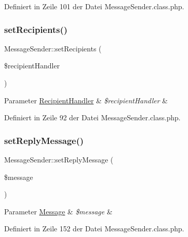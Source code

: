 Definiert in Zeile 101 der Datei Message\+Sender.\+class.\+php.

\mbox{\label{class_message_sender_a8e4fe082de4123d362a3383c89909bfb}} 
\subsubsection{\texorpdfstring{set\+Recipients()}{setRecipients()}}
{\footnotesize\ttfamily Message\+Sender\+::set\+Recipients (\begin{DoxyParamCaption}\item[{}]{\$recipient\+Handler }\end{DoxyParamCaption})}


\begin{DoxyParams}[1]{Parameter}
\mbox{\hyperlink{class_recipient_handler}{Recipient\+Handler}} & {\em \$recipient\+Handler} & \\
\hline
\end{DoxyParams}


Definiert in Zeile 92 der Datei Message\+Sender.\+class.\+php.

\mbox{\label{class_message_sender_a3f3faae1f609bd6838188eb669894c66}} 
\subsubsection{\texorpdfstring{set\+Reply\+Message()}{setReplyMessage()}}
{\footnotesize\ttfamily Message\+Sender\+::set\+Reply\+Message (\begin{DoxyParamCaption}\item[{}]{\$message }\end{DoxyParamCaption})}


\begin{DoxyParams}[1]{Parameter}
\mbox{\hyperlink{class_message}{Message}} & {\em \$message} & \\
\hline
\end{DoxyParams}


Definiert in Zeile 152 der Datei Message\+Sender.\+class.\+php.

\mbox{\label{class_message_sender_a0e835d4405f4cf0c4e7d46dc91e11126}} 
